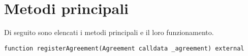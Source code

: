 \section{Metodi principali}

Di seguito sono elencati i metodi principali e il loro funzionamento.
\begin{verbatim}
function registerAgreement(Agreement calldata _agreement) external
\end{verbatim}